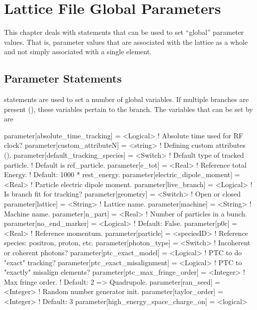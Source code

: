 \chapter{Lattice File Global Parameters}

This chapter deals with statements that can be used to set ``global''
parameter values. That is, parameter values that are associated with
the lattice as a whole and not simply associated with a single element.

\section{Parameter Statements}
\label{s:param}


 statements are used to set a number of global variables.
If multiple branches are present (), these variables pertain
to the  branch. The variables that can be set by  are
\begin{example}
  parameter[absolute_time_tracking]   = <Logical>   ! Absolute time used for RF clock?
  parameter[custom_attributeN]        = <string>    ! Defining custom attributes ().
  parameter[default_tracking_species] = <Switch>    ! Default type of tracked particle. 
                                                    !    Default is ref_particle.
  parameter[e_tot]                    = <Real>      ! Reference total Energy. 
                                                    !      Default: 1000 * rest_energy.
  parameter[electric_dipole_moment]   = <Real>      ! Particle electric dipole moment.
  parameter[live_branch]              = <Logical>   ! Is branch fit for tracking?
  parameter[geometry]                 = <Switch>    ! Open or closed
  parameter[lattice]                  = <String>    ! Lattice name.
  parameter[machine]                  = <String>    ! Machine name.
  parameter[n_part]                   = <Real>      ! Number of particles in a bunch.
  parameter[no_end_marker]            = <Logical>   ! Default: False.
  parameter[p0c]                      = <Real>      ! Reference momentum.
  parameter[particle]                 = <speciesID> ! Reference species: positron, proton, etc.
  parameter[photon_type]              = <Switch>    ! Incoherent or coherent photons?
  parameter[ptc_exact_model]          = <Logical>   ! PTC to do "exact" tracking?
  parameter[ptc_exact_misalignment]   = <Logical>   ! PTC to "exactly" misalign elements?
  parameter[ptc_max_fringe_order]     = <Integer>   ! Max fringe order. 
                                                    !    Default: 2 => Quadrupole.
  parameter[ran_seed]                 = <Integer>   ! Random number generator init.
  parameter[taylor_order]             = <Integer>   ! Default: 3
  parameter[high_energy_space_charge_on] = <logical>
\end{example}

